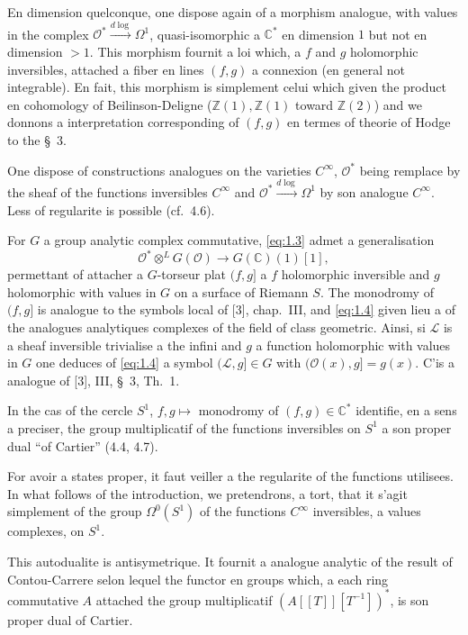 \documentclass[12pt,a4paper]{article}
\theoremstyle{plain}
\theoremstyle{definition}
\theoremstyle{remark}
\newcommand{\cO}{\mathcal{O}}
\newcommand{\Z}{\mathbb{Z}}
\newcommand{\C}{\mathbb{C}}
\newcommand{\cL}{\mathcal{L}}
\providecommand{\cL}{\mathcal{L}}
\providecommand{\cO}{\mathcal{O}}
\begin{document}
En dimension quelconque, one dispose again of a morphism analogue, with values in the complex $\cO^* \xrightarrow{d\log} \Omega^1$, quasi-isomorphic a $\C^*$ en dimension $1$ but not en dimension $>1$. This morphism fournit a loi which, a $f$ and $g$ holomorphic inversibles, attached
a fiber en lines $(f,g)$ a connexion (en general not integrable). En fait, this morphism
is simplement celui which given the product en cohomology of Beilinson-Deligne ($\Z(1), \Z(1)$
toward $\Z(2)$) and we donnons a interpretation corresponding of $(f,g)$ en termes of
theorie of Hodge to the \S~3.

One dispose of constructions analogues on the varieties $C^\infty$, $\cO^*$ being remplace by
the sheaf of the functions inversibles $C^\infty$ and $\cO^* \xrightarrow{d\log} \Omega^1$ by son analogue $C^\infty$. Less of
regularite is possible (cf.~4.6).

For $G$ a group analytic complex commutative, \eqref{eq:1.3} admet a generalisation
\begin{equation}\label{eq:1.4}
\cO^* \otimes^L G(\cO) \to G(\C)(1)[1],
\end{equation}
permettant of attacher a $G$-torseur plat $(f,g]$ a $f$ holomorphic inversible and $g$ holomorphic
with values in $G$ on a surface of Riemann $S$. The monodromy of $(f,g]$ is analogue
to the symbols local of [3], chap.~III, and \eqref{eq:1.4} given lieu a of the analogues analytiques
complexes of the field of class geometric. Ainsi, si $\cL$ is a sheaf inversible trivialise
a the infini and $g$ a function holomorphic with values in $G$ one deduces of \eqref{eq:1.4} a symbol
$(\cL,g] \in G$ with $(\cO(x), g] = g(x)$. C'is a analogue of [3], III, \S~3, Th.~1.

In the cas of the cercle $S^1$, $f, g \mapsto {}$ monodromy of $(f,g) \in \C^*$ identifie, en a sens
a preciser, the group multiplicatif of the functions inversibles on $S^1$ a son proper dual ``of
Cartier'' (4.4, 4.7).

For avoir a states proper, it faut veiller a the regularite of the functions utilisees.
In what follows of the introduction, we pretendrons, a tort, that it s'agit simplement of the
group $\Omega^0(S^1)$ of the functions $C^\infty$ inversibles, a values complexes, on $S^1$.

This autodualite is antisymetrique. It fournit a analogue analytic of the result
of Contou-Carrere selon lequel the functor en groups which, a each ring commutative $A$ attached the group multiplicatif $(A[[T]][T^{-1}])^*$, is son proper dual of Cartier.
\end{document}
